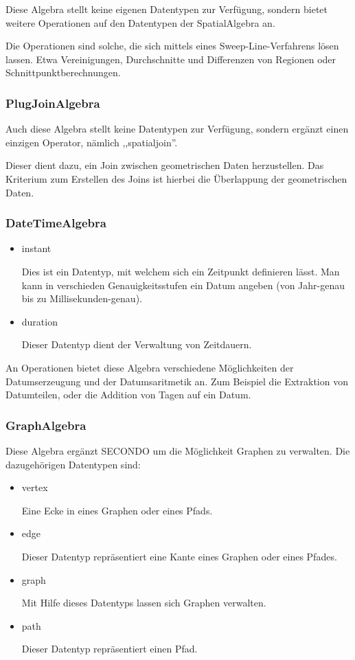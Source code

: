 Diese Algebra stellt keine eigenen Datentypen zur Verfügung, sondern bietet weitere Operationen auf den Datentypen der SpatialAlgebra an.

Die Operationen sind solche, die sich mittels eines Sweep-Line-Verfahrens lösen lassen. Etwa Vereinigungen, Durchschnitte und Differenzen von Regionen oder Schnittpunktberechnungen.

\subsubsection{PlugJoinAlgebra}

Auch diese Algebra stellt keine Datentypen zur Verfügung, sondern ergänzt einen einzigen Operator, nämlich ,,spatialjoin''.

Dieser dient dazu, ein Join zwischen geometrischen Daten herzustellen. Das Kriterium zum Erstellen des Joins ist hierbei die Überlappung der geometrischen Daten. 

\subsubsection{DateTimeAlgebra}
\begin{itemize}
\item instant

Dies ist ein Datentyp, mit welchem sich ein Zeitpunkt definieren lässt. Man kann in verschieden Genauigkeitsstufen ein Datum angeben (von Jahr-genau bis zu Millisekunden-genau).
\item duration

Dieser Datentyp dient der Verwaltung von Zeitdauern.
\end{itemize}

An Operationen bietet diese Algebra verschiedene Möglichkeiten der Datumserzeugung und der Datumsaritmetik an. Zum Beispiel die Extraktion von Datumteilen, oder die Addition von Tagen auf ein Datum.

\subsubsection{GraphAlgebra}

Diese Algebra ergänzt SECONDO um die Möglichkeit Graphen zu verwalten. Die dazugehörigen Datentypen sind:

\begin{itemize}
\item vertex

Eine Ecke in eines Graphen oder eines Pfads.
\item edge

Dieser Datentyp repräsentiert eine Kante eines Graphen oder eines Pfades.
\item graph

Mit Hilfe dieses Datentyps lassen sich Graphen verwalten.
\item path

Dieser Datentyp repräsentiert einen Pfad.
\end{itemize}

